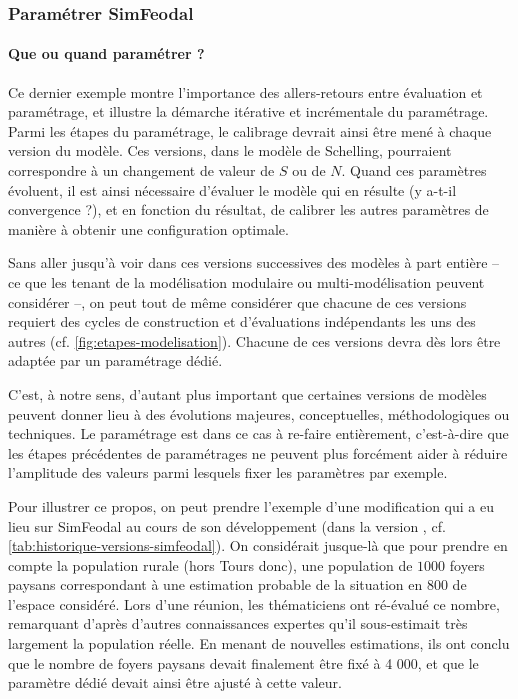 \subsubsection{Paramétrer SimFeodal}

\paragraph{Que ou quand paramétrer ?} \label{sssec:parametrer-un-des-modeles}

Ce dernier exemple montre l'importance des allers-retours entre évaluation et paramétrage, et illustre la démarche itérative et incrémentale du paramétrage.
Parmi les étapes du paramétrage, le calibrage devrait ainsi être mené à chaque \og version\fg{} du modèle.
Ces versions, dans le modèle de Schelling, pourraient correspondre à un changement de valeur de $S$ ou de $N$.
Quand ces paramètres évoluent, il est ainsi nécessaire d'évaluer le modèle qui en résulte (y a-t-il convergence ?), et en fonction du résultat, de calibrer les autres paramètres de manière à obtenir une configuration optimale.

Sans aller jusqu'à voir dans ces versions successives des modèles à part entière -- ce que les tenant de la modélisation modulaire \autocite{grimm_pattern-oriented_2005} ou multi-modélisation \autocite{pumain_chapter_2017} peuvent considérer --, on peut tout de même considérer que chacune de ces versions requiert des cycles de construction et d'évaluations indépendants les uns des autres (cf. \cref{fig:etapes-modelisation}).
Chacune de ces versions devra dès lors être adaptée par un paramétrage dédié.

C'est, à notre sens, d'autant plus important que certaines versions de modèles peuvent donner lieu à des évolutions majeures, conceptuelles, méthodologiques ou techniques.
Le paramétrage est dans ce cas à \og re-faire\fg{} entièrement, c'est-à-dire que les étapes précédentes de paramétrages ne peuvent plus forcément aider à réduire l'amplitude des valeurs parmi lesquels fixer les paramètres par exemple.

Pour illustrer ce propos, on peut prendre l'exemple d'une modification qui a eu lieu sur SimFeodal au cours de son développement (dans la version \fg{}, cf. \cref{tab:historique-versions-simfeodal}).
On considérait jusque-là que pour prendre en compte la population rurale (hors Tours donc), une population de $1000$ foyers paysans correspondant à une estimation probable de la situation en 800 de l'espace considéré.
Lors d'une réunion, les thématiciens ont ré-évalué ce nombre, remarquant d'après d'autres connaissances expertes qu'il sous-estimait très largement la population réelle.
En menant de nouvelles estimations, ils ont conclu que le nombre de foyers paysans devait finalement être fixé à 4 000, et que le paramètre dédié devait ainsi être ajusté à cette valeur.


